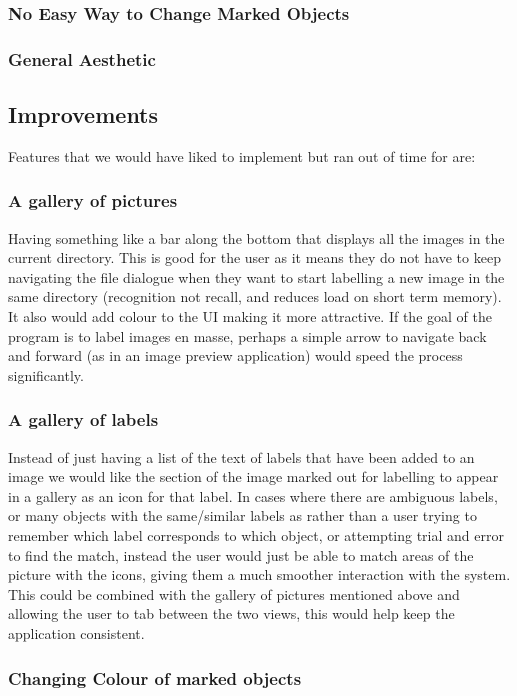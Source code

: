 \documentclass[a4paper,11pt,oneside]{article}
\begin{document}
\subsubsection{No Easy Way to Change Marked Objects}
\subsubsection{General Aesthetic}

\subsection{Improvements}
Features that we would have liked to implement but ran out of time for are:
\subsubsection{A gallery of pictures} 
Having something like a bar along the bottom that displays all the images in the
current directory.  This is good for the user as it means they do not have to
keep navigating the file dialogue when they want to start labelling a new image
in the same directory (recognition not recall, and reduces load on short term
memory).  It also would add colour to the UI making it more attractive. If the
goal of the program is to label images en masse, perhaps a simple arrow to
navigate back and forward (as in an image preview application) would speed the
process significantly.
\subsubsection{A gallery of labels}
Instead of just having a list of the text of labels that have been added to an
image we would like the section of the image marked out for labelling to appear
in a gallery as an icon for that label.  In cases where there are ambiguous
labels, or many objects with the same/similar labels as rather than a user
trying to remember which label corresponds to which object, or attempting trial
and error to find the match, instead the user would just be able to match areas
of the picture with the icons, giving them a much smoother interaction with the
system.  This could be combined with the gallery of pictures mentioned above and
allowing the user to tab between the two views, this would help keep the
application consistent.
\subsubsection{Changing Colour of marked objects}
\end{document}
